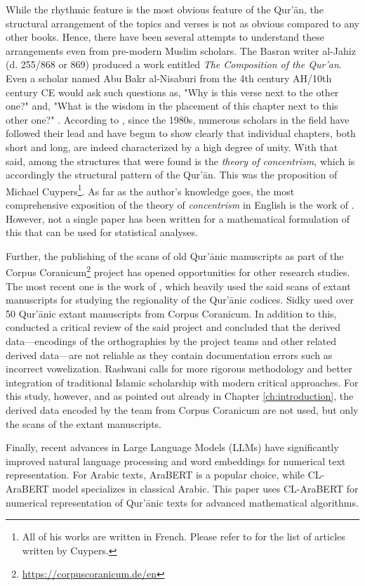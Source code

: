 While the rhythmic feature is the most obvious feature of the Qur'\=an, the structural arrangement of the topics and verses is not as obvious compared to any other books. Hence, there have been several attempts to understand these arrangements even from pre-modern Muslim scholars. The Basran writer al-Jahiz (d. 255/868 or 869) produced a work entitled \textit{The Composition of the Qur'an}. Even a scholar named Abu Bakr al-Nisaburi from the 4th century AH/10th century CE would ask such questions as, "Why is this verse next to the other one?" and, "What is the wisdom in the placement of this chapter next to this other one?" . According to , since the 1980s, numerous scholars in the field have followed their lead and have begun to show clearly that individual chapters, both short and long, are indeed characterized by a high degree of unity. With that said, among the structures that were found is the \textit{theory of concentrism}, which is accordingly the structural pattern of the Qur'\=an. This was the proposition of Michael Cuypers\footnote{All of his works are written in French. Please refer to  for the list of articles written by Cuypers.}. As far as the author's knowledge goes, the most comprehensive exposition of the theory of \textit{concentrism} in English is the work of . However, not a single paper has been written for a mathematical formulation of this that can be used for statistical analyses. 

Further, the publishing of the scans of old Qur'\=anic manuscripts as part of the Corpus Coranicum\footnote{\url{https://corpuscoranicum.de/en}} project has opened opportunities for other research studies. The most recent one is the work of , which heavily used the said scans of extant manuscripts for studying the regionality of the Qur'\=anic codices. Sidky used over 50 Qur'\=anic extant manuscripts from Corpus Coranicum. In addition to this,  conducted a critical review of the said project and concluded that the derived data---encodings of the orthographies by the project teams and other related derived data---are not reliable as they contain documentation errors such as incorrect vowelization. Rashwani calls for more rigorous methodology and better integration of traditional Islamic scholarship with modern critical approaches. For this study, however, and as pointed out already in Chapter \ref{ch:introduction}, the derived data encoded by the team from Corpus Coranicum are not used, but only the scans of the extant manuscripts. 

Finally, recent advances in Large Language Models (LLMs) have significantly improved natural language processing and word embeddings for numerical text representation. For Arabic texts, AraBERT \cite{antoun-etal-2020-arabert} is a popular choice, while CL-AraBERT \cite{MALHAS2022103068} model specializes in classical Arabic. This paper uses CL-AraBERT for numerical representation of Qur'\=anic texts for advanced mathematical algorithms.